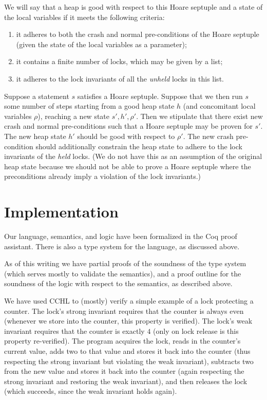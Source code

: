 We will say that a heap is good with respect to this Hoare septuple
and a state of the local variables
if it meets the following criteria:
\begin{enumerate}
\item it adheres to both the crash and normal pre-conditions
of the Hoare septuple
(given the state of the local variables as a parameter);
\item it contains a finite number of locks, which may be given by a list;
\item it adheres to the lock invariants of all the \emph{unheld} locks
in this list.
\end{enumerate}
Suppose a statement $s$ satisfies a Hoare septuple.
Suppose that we then run $s$ some number of steps starting from
a good heap state $h$ (and concomitant local variables $\rho$),
reaching a new state $s', h', \rho'$.
Then we stipulate that there exist new crash and normal pre-conditions
such that a Hoare septuple may be proven for $s'$.
The new heap state $h'$ should be good with respect to $\rho'$.
The new crash pre-condition should additionally constrain the heap state
to adhere to the lock invariants of the \emph{held} locks.
(We do not have this as an assumption of the original heap state because
we should not be able to prove a Hoare septuple where the preconditions
already imply a violation of the lock invariants.)

\section{Implementation}
\label{sec:imp}

Our language, semantics, and logic have been formalized in the Coq
proof assistant.
There is also a type system for the language, as discussed above.

As of this writing we have partial proofs of the soundness of the type system
(which serves mostly to validate the semantics), and a proof outline for the
soundness of the logic with respect to the semantics, as described above.

We have used CCHL to (mostly) verify a simple example of a lock protecting a
counter.  The lock's strong invariant requires that the counter is always even
(whenever we store into the counter, this property is verified). The lock's weak
invariant requires that the counter is exactly $4$ (only on lock release is this
property re-verified). The program acquires the lock, reads in the counter's
current value, adds two to that value and stores it back into the counter (thus
respecting the strong invariant but violating the weak invariant), subtracts two
from the new value and stores it back into the counter (again respecting the
strong invariant and restoring the weak invariant), and then releases the lock
(which succeeds, since the weak invariant holds again).

